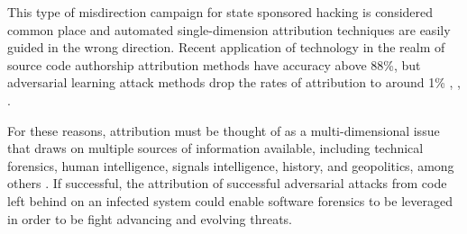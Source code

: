 \documentclass[12pt]{report}
\begin{document}
This type of misdirection campaign for state sponsored hacking is considered common place and automated single-dimension attribution techniques are easily guided in the wrong direction.  Recent application of technology in the realm of source code authorship attribution methods have accuracy above 88\%, but adversarial learning attack methods drop the rates of attribution to around 1\% \cite{abuhamad2018large}, \cite{caliskan2015anonymizing}, \cite{quiring2019misleading}. 

For these reasons, attribution must be thought of as a multi-dimensional issue that draws on multiple sources of information available, including technical forensics, human intelligence, signals intelligence, history, and geopolitics, among others \cite{lin2016attribution}.  If successful, the attribution of successful adversarial attacks from code left behind on an infected system could enable software forensics to be leveraged in order to be fight advancing and evolving threats. 
\end{document}
